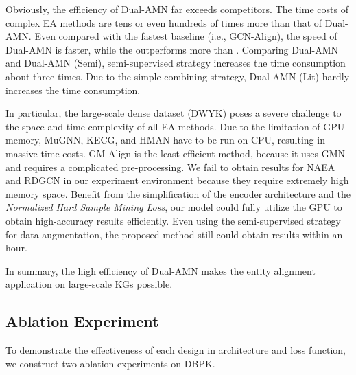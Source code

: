 \documentclass[sigconf]{acmart}
\begin{document}
Obviously, the efficiency of Dual-AMN far exceeds competitors.
The time costs of complex EA methods are tens or even hundreds of times more than that of Dual-AMN.
Even compared with the fastest baseline (i.e., GCN-Align), the speed of Dual-AMN is  faster, while the  outperforms more than .
Comparing Dual-AMN and Dual-AMN (Semi), semi-supervised strategy increases the time consumption about three times.
Due to the simple combining strategy, Dual-AMN (Lit) hardly increases the time consumption.

In particular, the large-scale dense dataset (DWYK) poses a severe challenge to the space and time complexity of all EA methods.
Due to the limitation of GPU memory, MuGNN, KECG, and HMAN have to be run on CPU, resulting in massive time costs.
GM-Align is the least efficient method, because it uses GMN and requires a complicated pre-processing.
We fail to obtain results for NAEA and RDGCN in our experiment environment because they require extremely high memory space.
Benefit from the simplification of the encoder architecture and the \emph{Normalized Hard Sample Mining Loss}, our model could fully utilize the GPU to obtain high-accuracy results efficiently.
Even using the semi-supervised strategy for data augmentation, the proposed method still could obtain results within an hour.

In summary, the high efficiency of Dual-AMN makes the entity alignment application on large-scale KGs possible.

\begin{table}[t]
\renewcommand\arraystretch{1.5}
\centering
{}
\caption{Ablation experiment of architecture on DBP15K.}
\label{table:model_ablation}
\end{table}

\subsection{Ablation Experiment}
To demonstrate the effectiveness of each design in architecture and loss function, we construct two ablation experiments on DBPK.
\end{document}
